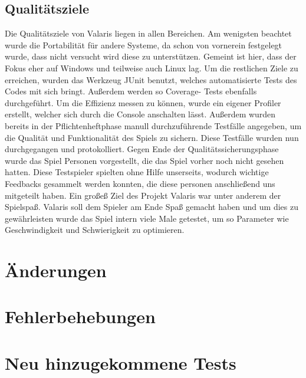 \documentclass[parskip=full]{scrartcl}
\begin{document}
	\subsection{Qualitätsziele}
	Die Qualitätsziele von Valaris liegen in allen Bereichen. 
	Am wenigsten beachtet wurde die Portabilität für andere Systeme, da schon 
	von vornerein festgelegt wurde, dass nicht versucht wird diese zu unterstützen.
	Gemeint ist hier, dass der Fokus eher auf Windows und teilweise auch Linux lag.
	Um die restlichen Ziele zu erreichen, wurden das Werkzeug JUnit benutzt, welches
	automatisierte Tests des Codes mit sich bringt. Außerdem werden so Coverage-
	Tests ebenfalls durchgeführt.
	Um die Effizienz messen zu können, wurde ein eigener Profiler erstellt, welcher
	sich durch die Console anschalten lässt.
	Außerdem wurden bereits in der Pflichtenheftphase manull durchzuführende 
	Testfälle angegeben, um die Qualität und Funktionalität des Spiels zu sichern.
	Diese Testfälle wurden nun durchgegangen und protokolliert.
	Gegen Ende der Qualitätssicherungsphase wurde das Spiel Personen
	vorgestellt, die das Spiel vorher noch nicht gesehen hatten. Diese Testspieler
	spielten ohne Hilfe unserseits, wodurch wichtige Feedbacks gesammelt werden 
	konnten, die diese personen anschließend uns mitgeteilt haben.
	Ein großeß Ziel des Projekt Valaris war unter anderem der Spielspaß. Valaris
	soll dem Spieler am Ende Spaß gemacht haben und um dies zu gewährleisten wurde 
	das Spiel intern viele Male getestet, um so Parameter wie Geschwindigkeit und
	Schwierigkeit zu optimieren.

	\pagebreak

	\section{Änderungen}
	
	\pagebreak
	
	
	
	

	\pagebreak
	\section{Fehlerbehebungen}
	
	
	
	\pagebreak
	
	\pagebreak
	
	\pagebreak

	

	\section{Neu hinzugekommene Tests}
\end{document}
